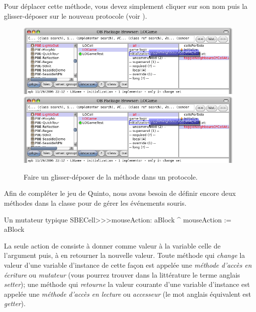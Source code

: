 \documentclass[a4paper,10pt,twoside]{book}
\begin{document}
Pour déplacer cette méthode, vous devez simplement cliquer sur son nom
puis la glisser-déposer sur le nouveau protocole (voir ).

\begin{figure}[htbp]
   \centering
   \ifluluelse
		{\includegraphics[width=\textwidth]{DragMethod} }
		{\includegraphics[scale=0.7]{DragMethod} }
   \caption{Faire un glisser-déposer de la méthode dans un protocole.\label{fig:dragMethod}}
\end{figure}

Afin de compléter le jeu de Quinto, nous avons besoin de définir encore deux méthodes dans la classe  pour de gérer les événements souris.
\begin{method}[mouseAction:]{Un mutateur typique}
SBECell>>>mouseAction: aBlock
   ^ mouseAction := aBlock
\end{method}

La seule action de  consiste à donner comme
valeur à la variable  celle de l'argument puis, à en
retourner la nouvelle valeur. Toute méthode qui \emph{change} la
valeur d'une variable d'instance de cette façon est appelée une
\emph{méthode d'accès en écriture} ou \emph{mutateur} (vous pourrez
trouver dans la littérature le terme anglais \emph{setter}); une
méthode qui \emph{retourne} la valeur courante d'une variable
d'instance est appelée une \emph{méthode d'accès en lecture} ou
\emph{accesseur} (le mot anglais équivalent est \emph{getter}).
\end{document}
